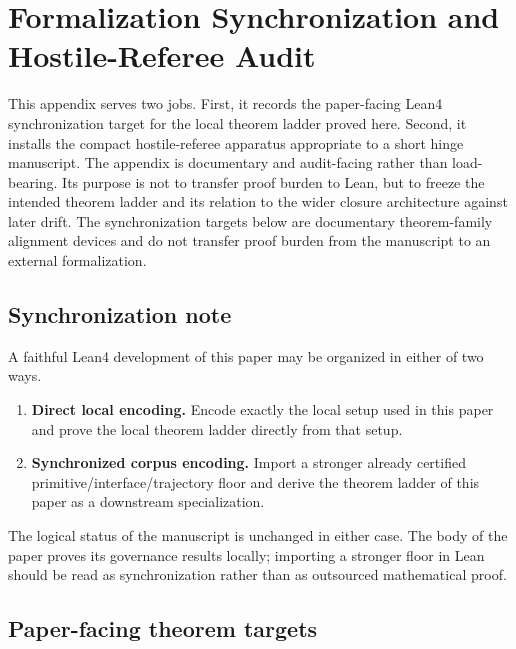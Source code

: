 \documentclass[11pt]{article}
\begin{document}
\appendix

\section{Formalization Synchronization and Hostile-Referee Audit}

This appendix serves two jobs. First, it records the paper-facing Lean4 synchronization target for the local theorem ladder proved here. Second, it installs the compact hostile-referee apparatus appropriate to a short hinge manuscript. The appendix is documentary and audit-facing rather than load-bearing. Its purpose is not to transfer proof burden to Lean, but to freeze the intended theorem ladder and its relation to the wider closure architecture against later drift. The synchronization targets below are documentary theorem-family alignment devices and do not transfer proof burden from the manuscript to an external formalization.

\subsection*{Synchronization note}

A faithful Lean4 development of this paper may be organized in either of two ways.
\begin{enumerate}
\item \textbf{Direct local encoding.} Encode exactly the local setup used in this paper and prove the local theorem ladder directly from that setup.
\item \textbf{Synchronized corpus encoding.} Import a stronger already certified primitive/interface/trajectory floor and derive the theorem ladder of this paper as a downstream specialization.
\end{enumerate}

The logical status of the manuscript is unchanged in either case. The body of the paper proves its governance results locally; importing a stronger floor in Lean should be read as synchronization rather than as outsourced mathematical proof.

\subsection*{Paper-facing theorem targets}
\end{document}
